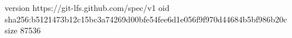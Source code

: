 version https://git-lfs.github.com/spec/v1
oid sha256:b5121473b12c15bc3a74269d00bfe54fee6d1e056f9f970d44684b5bf986b20c
size 87536
